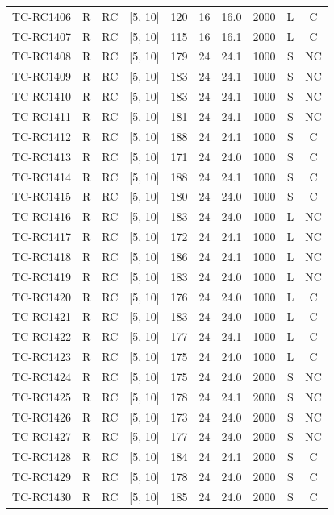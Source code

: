 \begin{longtable}{lccccccccc}
TC-RC1406 & R & RC & [5, 10] & 120 & 16 & 16.0 & 2000 & L & C \\
TC-RC1407 & R & RC & [5, 10] & 115 & 16 & 16.1 & 2000 & L & C \\
TC-RC1408 & R & RC & [5, 10] & 179 & 24 & 24.1 & 1000 & S & NC \\
TC-RC1409 & R & RC & [5, 10] & 183 & 24 & 24.1 & 1000 & S & NC \\
TC-RC1410 & R & RC & [5, 10] & 183 & 24 & 24.1 & 1000 & S & NC \\
TC-RC1411 & R & RC & [5, 10] & 181 & 24 & 24.1 & 1000 & S & NC \\
TC-RC1412 & R & RC & [5, 10] & 188 & 24 & 24.1 & 1000 & S & C \\
TC-RC1413 & R & RC & [5, 10] & 171 & 24 & 24.0 & 1000 & S & C \\
TC-RC1414 & R & RC & [5, 10] & 188 & 24 & 24.1 & 1000 & S & C \\
TC-RC1415 & R & RC & [5, 10] & 180 & 24 & 24.0 & 1000 & S & C \\
TC-RC1416 & R & RC & [5, 10] & 183 & 24 & 24.0 & 1000 & L & NC \\
TC-RC1417 & R & RC & [5, 10] & 172 & 24 & 24.1 & 1000 & L & NC \\
TC-RC1418 & R & RC & [5, 10] & 186 & 24 & 24.1 & 1000 & L & NC \\
TC-RC1419 & R & RC & [5, 10] & 183 & 24 & 24.0 & 1000 & L & NC \\
TC-RC1420 & R & RC & [5, 10] & 176 & 24 & 24.0 & 1000 & L & C \\
TC-RC1421 & R & RC & [5, 10] & 183 & 24 & 24.0 & 1000 & L & C \\
TC-RC1422 & R & RC & [5, 10] & 177 & 24 & 24.1 & 1000 & L & C \\
TC-RC1423 & R & RC & [5, 10] & 175 & 24 & 24.0 & 1000 & L & C \\
TC-RC1424 & R & RC & [5, 10] & 175 & 24 & 24.0 & 2000 & S & NC \\
TC-RC1425 & R & RC & [5, 10] & 178 & 24 & 24.1 & 2000 & S & NC \\
TC-RC1426 & R & RC & [5, 10] & 173 & 24 & 24.0 & 2000 & S & NC \\
TC-RC1427 & R & RC & [5, 10] & 177 & 24 & 24.0 & 2000 & S & NC \\
TC-RC1428 & R & RC & [5, 10] & 184 & 24 & 24.1 & 2000 & S & C \\
TC-RC1429 & R & RC & [5, 10] & 178 & 24 & 24.0 & 2000 & S & C \\
TC-RC1430 & R & RC & [5, 10] & 185 & 24 & 24.0 & 2000 & S & C \\

\end{longtable}
